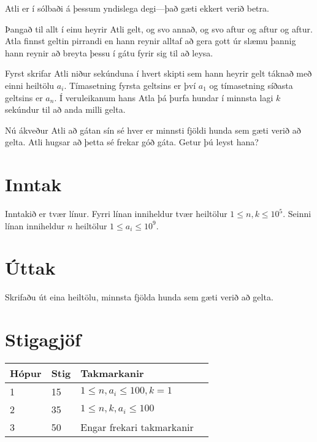 Atli er í sólbaði á þessum yndislega degi---það gæti ekkert verið betra.

Þangað til allt í einu heyrir Atli gelt, og svo annað, og svo aftur og aftur og aftur.
Atla finnst geltin pirrandi en hann reynir alltaf að gera gott úr slæmu þannig hann
reynir að breyta þessu í gátu fyrir sig til að leysa.

Fyrst skrifar Atli niður sekúnduna í hvert skipti sem hann heyrir gelt táknað með einni
heiltölu $a_i$. 
Tímasetning fyrsta geltsins er því $a_1$ og tímasetning síðasta geltsins er $a_n$.
Í veruleikanum hans Atla þá þurfa hundar í minnsta lagi $k$ sekúndur til að anda milli gelta.

Nú ákveður Atli að gátan sín sé hver er minnsti fjöldi hunda sem gæti verið að gelta.
Atli hugsar að þetta sé frekar góð gáta. Getur þú leyst hana?

\section*{Inntak}
Inntakið er tvær línur.
Fyrri línan inniheldur tvær heiltölur $1 \le n,k \le 10^5$. 
Seinni línan inniheldur $n$ heiltölur $1 \le a_i \le 10^9$.

\section*{Úttak}
Skrifaðu út eina heiltölu, minnsta fjölda hunda sem gæti verið að gelta.

\section*{Stigagjöf}
\begin{tabular}{|l|l|l|l|}
\hline
Hópur & Stig & Takmarkanir \\ \hline
1     & 15    & $1 \le n,a_i \le 100, k = 1 $\\ \hline
2     & 35    & $1 \le n,k,a_i \le 100 $\\ \hline
3     & 50    & Engar frekari takmarkanir \\ \hline
\end{tabular}
